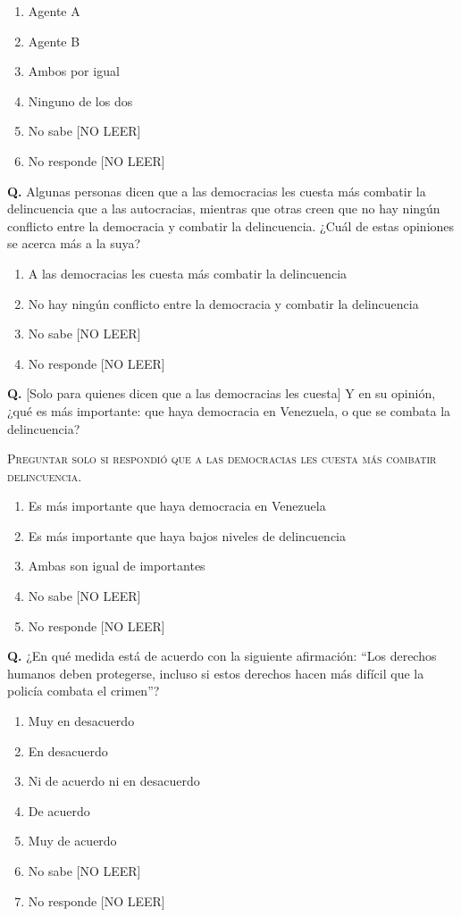 \documentclass[11pt,letterpaper]{article}
\newcounter{question}
\newcommand{\question}[1]{%
  \stepcounter{question}%
  \vspace{0.3em}%
  \noindent\textbf{Q\thequestion.} #1%
}
\newcommand{\instruction}[1]{%
  \vspace{0.1em}%
  \noindent\textsc{\small #1}%
  \vspace{0.1em}%
}
\newenvironment{responses}
{\begin{enumerate}[label=(\arabic*), leftmargin=2em, itemsep=0em, parsep=0em, topsep=0em]}
{\end{enumerate}\vspace{0.3em}}
\begin{document}
\begin{responses}
\item Agente A
\item Agente B
\item Ambos por igual
\item Ninguno de los dos
\item[(98)] No sabe [NO LEER]
\item[(99)] No responde [NO LEER]
\end{responses}

\question{Algunas personas dicen que a las democracias les cuesta más combatir la delincuencia que a las autocracias, mientras que otras creen que no hay ningún conflicto entre la democracia y combatir la delincuencia. ¿Cuál de estas opiniones se acerca más a la suya?}
\begin{responses}
\item A las democracias les cuesta más combatir la delincuencia
\item No hay ningún conflicto entre la democracia y combatir la delincuencia
\item[(98)] No sabe [NO LEER]
\item[(99)] No responde [NO LEER]
\end{responses}

\question{[Solo para quienes dicen que a las democracias les cuesta] Y en su opinión, ¿qué es más importante: que haya democracia en Venezuela, o que se combata la delincuencia?}

\instruction{Preguntar solo si respondió que a las democracias les cuesta más combatir delincuencia.}
\begin{responses}
\item Es más importante que haya democracia en Venezuela
\item Es más importante que haya bajos niveles de delincuencia
\item Ambas son igual de importantes
\item[(98)] No sabe [NO LEER]
\item[(99)] No responde [NO LEER]
\end{responses}

\question{¿En qué medida está de acuerdo con la siguiente afirmación: ``Los derechos humanos deben protegerse, incluso si estos derechos hacen más difícil que la policía combata el crimen''?}
\begin{responses}
\item Muy en desacuerdo
\item En desacuerdo
\item Ni de acuerdo ni en desacuerdo
\item De acuerdo
\item Muy de acuerdo
\item[(98)] No sabe [NO LEER]
\item[(99)] No responde [NO LEER]
\end{responses}
\end{document}
